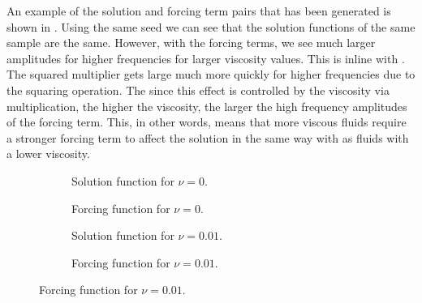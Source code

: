 An example of the solution and forcing term pairs that has been generated is shown in . Using the same seed we can see that the solution functions of the same sample are the same. However, with the forcing terms, we see much larger amplitudes for higher frequencies for larger viscosity values. This is inline with . The squared multiplier gets large much more quickly for higher frequencies due to the squaring operation. The since this effect is controlled by the viscosity via multiplication, the higher the viscosity, the larger the high frequency amplitudes of the forcing term. This, in other words, means that more viscous fluids require a stronger forcing term to affect the solution in the same way with as fluids with a lower viscosity.

\begin{figure}[H]
  \centering
  \begin{subfigure}{0.49\linewidth}
    \begin{adjustbox}{width=\linewidth}
      
    \end{adjustbox}
    \caption{Solution function for \(\nu=0\).}\label{fig:burgers_solution_0.0}
  \end{subfigure}
  \begin{subfigure}{0.49\linewidth}
    \begin{adjustbox}{width=\linewidth}
      
    \end{adjustbox}
    \caption{Forcing function for \(\nu=0\).}\label{fig:burgers_forcing_0.0}
  \end{subfigure}
  \begin{subfigure}{0.49\linewidth}
    \begin{adjustbox}{width=\linewidth}
      
    \end{adjustbox}
    \caption{Solution function for \(\nu=0.01\).}\label{fig:burgers_solution_0.01}
  \end{subfigure}
  \begin{subfigure}{0.49\linewidth}
    \begin{adjustbox}{width=\linewidth}
      
    \end{adjustbox}
    \caption{Forcing function for \(\nu=0.01\).}\label{fig:burgers_forcing_0.01}
  \end{subfigure}

\end{figure}
